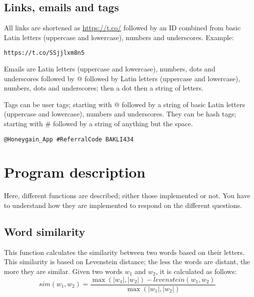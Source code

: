 \documentclass[11pt, a4paper]{article}
\begin{document}

\subsection{Links, emails and tags}

All links are shortened as \url{https://t.co/} followed by an ID combined from basic Latin letters (uppercase and lowercase), numbers and underscores. 
Example:
\begin{verbatim}
https://t.co/SSjjlxm8n5
\end{verbatim}

Emails are Latin letters (uppercase and lowercase), numbers, dots and underscores followed by @ followed by Latin letters (uppercase and lowercase), numbers, dots and underscores; then a dot then a string of letters.

Tags can be user tags; starting with @ followed by a string of basic Latin letters (uppercase and lowercase), numbers and underscores. 
They can be hash tags; starting with \# followed by a string of anything but the space.
\begin{verbatim}
@Honeygain_App #ReferralCode BAKLI434 
\end{verbatim}

\section{Program description}

Here, different functions are described; either those implemented or not. 
You have to understand how they are implemented to respond on the different questions.

\subsection{Word similarity}

This function calculates the similarity between two words based on their letters.
This similarity is based on Levenstein distance; the less the words are distant, the more they are similar.
Given two words $w_1$ and $w_2$, it is calculated as follows:
\[sim(w_1, w_2) = \frac{\max(|w_1|, |w_2|) - levenstein(w_1, w_2)}{\max(|w_1|, |w_2|)}\]
\end{document}
